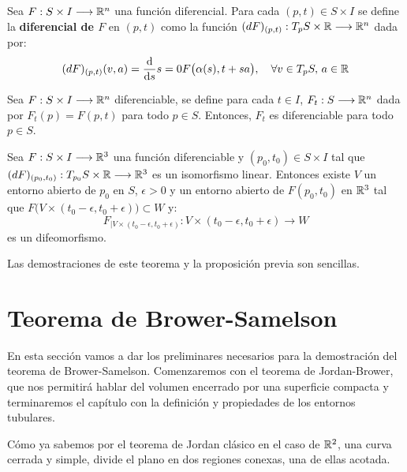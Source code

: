 \begin{definition}[Diferencial]
Sea $F: S \times I \longrightarrow \mathbb{R}^n$ una función diferencial. Para cada $(p,t) \in S \times I$ se define la \textbf{diferencial de $F$} en $(p,t)$ como la función $(dF)_{(p,t)}: T_pS \times \mathbb{R} \longrightarrow \mathbb{R}^n$ dada por:
%
\begin{equation*}
    (dF)_{(p,t)}(v,a) = \diff{}{s}{s=0} F \big( \alpha(s), t+sa \big), \quad \forall v \in T_pS, \, a \in \rmath
\end{equation*}
\end{definition}

\begin{proposition}
Sea $F: S \times I \longrightarrow \mathbb{R}^n$ diferenciable, se define para cada $t\in I$, $F_t: S \longrightarrow \mathbb{R}^n$ dada por $F_t(p) = F(p,t)$ para todo $p \in S$. Entonces, $F_t$ es diferenciable para todo $p \in S$.
\end{proposition}

\begin{theorem}
Sea $F: S \times I \longrightarrow \mathbb{R}^3$ una función diferenciable y $(p_0,t_0) \in S \times I$ tal que $(dF)_{(p_0,t_0)} : T_{p_0}S \times \mathbb{R} \longrightarrow \mathbb{R}^3$ es un isomorfismo linear. Entonces existe $V$ un entorno abierto de $p_0$ en $S$, $\epsilon > 0$ y un entorno abierto de $F(p_0, t_0)$ en $\mathbb{R}^3$ tal que $F \big( V \times (t_0-\epsilon, t_0+\epsilon) \big) \subset W$ y:
%
\begin{equation*}
    F_{|V \times (t_0-\epsilon, t_0+\epsilon)}: V \times (t_0-\epsilon, t_0+\epsilon) \longrightarrow W
\end{equation*}
%
es un difeomorfismo.
\end{theorem}

Las demostraciones de este teorema y la proposición previa son sencillas.

\section{Teorema de Brower-Samelson}

En esta sección vamos a dar los preliminares necesarios para la demostración del teorema de Brower-Samelson. Comenzaremos con el teorema de Jordan-Brower, que nos permitirá hablar del volumen encerrado por una superficie compacta y terminaremos el capítulo con la definición y propiedades de los entornos tubulares.

Cómo ya sabemos por el teorema de Jordan clásico en el caso de $\mathbb{R}^2$, una curva cerrada y simple, divide el plano en dos regiones conexas, una de ellas acotada.

